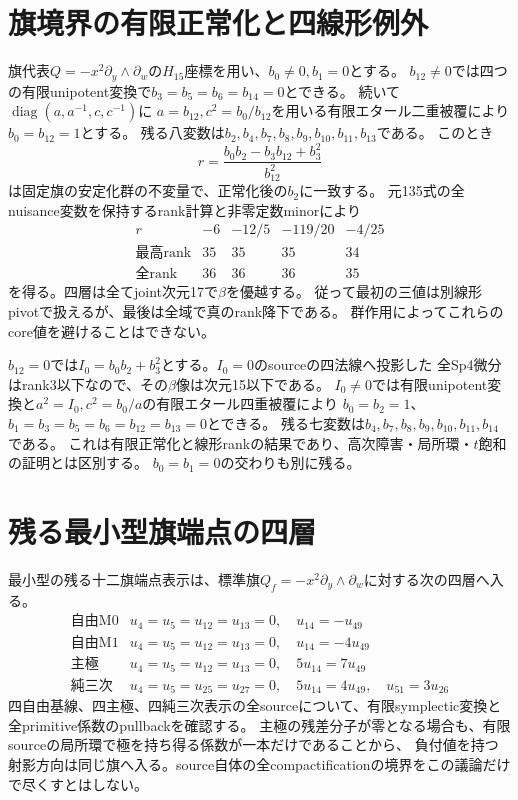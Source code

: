 \documentclass[11pt,a4paper]{ltjsarticle}
\theoremstyle{remark}
\begin{document}
\section{旗境界の有限正常化と四線形例外}
旗代表$Q=-x^2\partial_y\wedge\partial_w$の$H_{15}$座標を用い、$b_0\ne0,b_1=0$とする。
$b_{12}\ne0$では四つの有限unipotent変換で$b_3=b_5=b_6=b_{14}=0$とできる。
続いて$\operatorname{diag}(a,a^{-1},c,c^{-1})$に
$a=b_{12},c^2=b_0/b_{12}$を用いる有限エタール二重被覆により$b_0=b_{12}=1$とする。
残る八変数は$b_2,b_4,b_7,b_8,b_9,b_{10},b_{11},b_{13}$である。
このとき
\[
 r=\frac{b_0b_2-b_3b_{12}+b_3^2}{b_{12}^2}
\]
は固定旗の安定化群の不変量で、正常化後の$b_2$に一致する。
元135式の全nuisance変数を保持するrank計算と非零定数minorにより
\[
\begin{array}{c|rrrr}
 r&-6&-12/5&-119/20&-4/25\\\hline
 \text{最高rank}&35&35&35&34\\
 \text{全rank}&36&36&36&35
\end{array}
\]
を得る。四層は全てjoint次元17で$\beta$を優越する。
従って最初の三値は別線形pivotで扱えるが、最後は全域で真のrank降下である。
群作用によってこれらのcore値を避けることはできない。

$b_{12}=0$では$I_0=b_0b_2+b_3^2$とする。$I_0=0$のsourceの四法線へ投影した
全Sp4微分はrank3以下なので、その$\beta$像は次元15以下である。
$I_0\ne0$では有限unipotent変換と$a^2=I_0,c^2=b_0/a$の有限エタール四重被覆により
$b_0=b_2=1$、$b_1=b_3=b_5=b_6=b_{12}=b_{13}=0$とできる。
残る七変数は$b_4,b_7,b_8,b_9,b_{10},b_{11},b_{14}$である\cite{flag-normal-v45}。
これは有限正常化と線形rankの結果であり、高次障害・局所環・$t$飽和の証明とは区別する。
$b_0=b_1=0$の交わりも別に残る。

\section{残る最小型旗端点の四層}
最小型の残る十二旗端点表示は、標準旗$Q_f=-x^2\partial_y\wedge\partial_w$に対する次の四層へ入る。
\[
\begin{array}{c|l}
\text{自由M0}&u_4=u_5=u_{12}=u_{13}=0,\quad u_{14}=-u_{49}\\
\text{自由M1}&u_4=u_5=u_{12}=u_{13}=0,\quad u_{14}=-4u_{49}\\
\text{主極}&u_4=u_5=u_{12}=u_{13}=0,\quad5u_{14}=7u_{49}\\
\text{純三次}&u_4=u_5=u_{25}=u_{27}=0,\quad5u_{14}=4u_{49},\quad u_{51}=3u_{26}
\end{array}
\]
四自由基線、四主極、四純三次表示の全sourceについて、有限symplectic変換と全primitive係数のpullbackを確認する。
主極の残差分子が零となる場合も、有限sourceの局所環で極を持ち得る係数が一本だけであることから、
負付値を持つ射影方向は同じ旗へ入る。source自体の全compactificationの境界をこの議論だけで尽くすとはしない。
\end{document}
